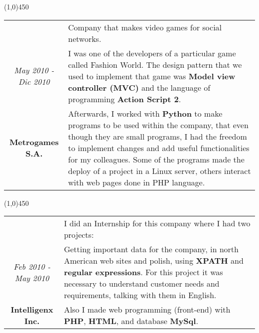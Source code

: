 \begin{center}
\line(1,0){450}
\end{center}
\noindent
\begin{tabular}{c|p{12.5cm}}
& \large Company that makes video games for social networks. \\
\large\textit{May 2010 - Dic 2010} &  \large I was one of the developers of a particular game called Fashion World. The design pattern that we used to implement that game was \textbf{Model view controller (MVC)} and the language of programming \textbf{Action Script 2}.\\
\large\textbf{Metrogames S.A.} & \large Afterwards, I worked with \textbf{Python} to make programs to be used within the company, that even though they are small programs, I had the freedom to implement changes and add useful functionalities for my colleagues. Some of the programs made the deploy of a project in a Linux server, others interact with web pages done in PHP language.
\end{tabular}

\begin{center}
\line(1,0){450}
\end{center}
\noindent
\begin{tabular}{c|p{12.5cm}}
& \large I did an Internship for this company where I had two projects:\\
\large\textit{Feb 2010 - May 2010} & \large Getting important data for the company, in north American web sites and polish, using \textbf{XPATH} and \textbf{regular expressions}.  For this project it was necessary to understand customer needs and requirements, talking with them in English.\\
\large\textbf{Intelligenx Inc.} & \large Also I made web programming (front-end) with \textbf{PHP}, \textbf{HTML}, and database \textbf{MySql}.
\end{tabular}

